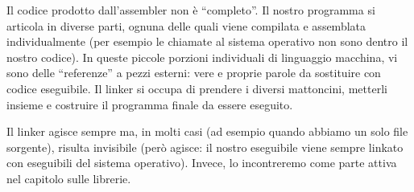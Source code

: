 \begin{small}
	Il codice prodotto dall'assembler non è ``completo''. Il nostro programma si articola in diverse parti, ognuna delle quali viene compilata e assemblata individualmente (per esempio le chiamate al sistema operativo non sono dentro il nostro codice). In queste piccole porzioni individuali di linguaggio macchina, vi sono delle ``referenze'' a pezzi esterni: vere e proprie parole da sostituire con codice eseguibile. Il linker si occupa di prendere i diversi mattoncini, metterli insieme e costruire il programma finale da essere eseguito. 
	
	Il linker agisce sempre ma, in molti casi (ad esempio quando abbiamo un solo file sorgente), risulta  invisibile (però agisce: il nostro eseguibile viene sempre linkato con eseguibili del sistema operativo). Invece, lo incontreremo come parte attiva nel capitolo sulle librerie.
	\end{small}
